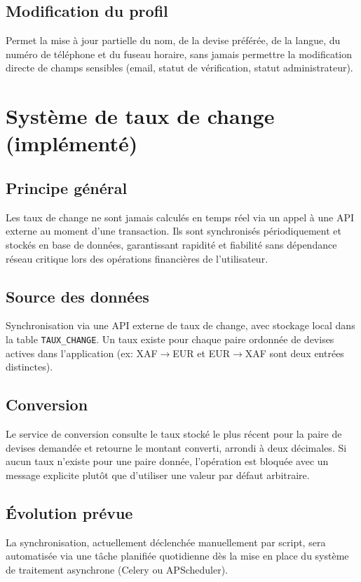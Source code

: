 \documentclass[11pt,a4paper]{article}
\begin{document}
\subsection{Modification du profil}
Permet la mise à jour partielle du nom, de la devise préférée, de la langue, du numéro de téléphone et du fuseau horaire, sans jamais permettre la modification directe de champs sensibles (email, statut de vérification, statut administrateur).

\section{Système de taux de change (implémenté)}

\subsection{Principe général}
Les taux de change ne sont jamais calculés en temps réel via un appel à une API externe au moment d'une transaction. Ils sont synchronisés périodiquement et stockés en base de données, garantissant rapidité et fiabilité sans dépendance réseau critique lors des opérations financières de l'utilisateur.

\subsection{Source des données}
Synchronisation via une API externe de taux de change, avec stockage local dans la table \texttt{TAUX\_CHANGE}. Un taux existe pour chaque paire ordonnée de devises actives dans l'application (ex: XAF$\to$EUR et EUR$\to$XAF sont deux entrées distinctes).

\subsection{Conversion}
Le service de conversion consulte le taux stocké le plus récent pour la paire de devises demandée et retourne le montant converti, arrondi à deux décimales. Si aucun taux n'existe pour une paire donnée, l'opération est bloquée avec un message explicite plutôt que d'utiliser une valeur par défaut arbitraire.

\subsection{Évolution prévue}
La synchronisation, actuellement déclenchée manuellement par script, sera automatisée via une tâche planifiée quotidienne dès la mise en place du système de traitement asynchrone (Celery ou APScheduler).
\end{document}
